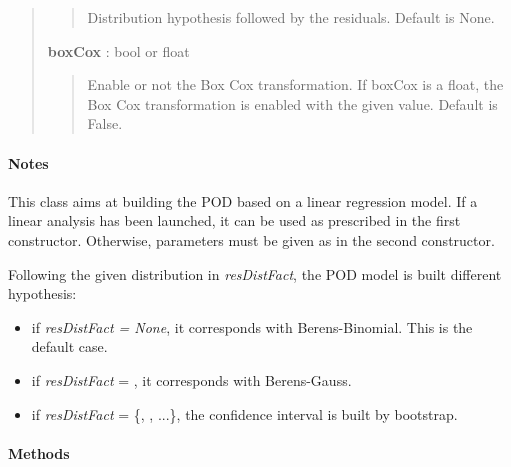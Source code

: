 \documentclass[letterpaper,10pt,english]{sphinxmanual}
\begin{document}
\begin{fulllineitems}
\begin{quote}
\begin{description}
\begin{quote}
Distribution hypothesis followed by the residuals. Default is None.
\end{quote}

\textbf{boxCox} : bool or float
\begin{quote}

Enable or not the Box Cox transformation. If boxCox is a float, the Box
Cox transformation is enabled with the given value. Default is False.
\end{quote}

\end{description}\end{quote}
\paragraph{Notes}

This class aims at building the POD based on a linear regression
model. If a linear analysis has been launched, it can be used as prescribed 
in the first constructor. Otherwise, parameters must be given as in the
second constructor.

Following the given distribution in \emph{resDistFact}, the POD model is built
different hypothesis:
\begin{itemize}
\item {} 
if \emph{resDistFact = None}, it corresponds with Berens-Binomial. This
is the default case.

\item {} 
if \emph{resDistFact} = \href{http://doc.openturns.org/openturns-latest/sphinx/user\_manual/\_generated/openturns.NormalFactory.html\#openturns.NormalFactory}{}, it corresponds with Berens-Gauss.

\item {} 
if \emph{resDistFact} = \{\href{http://doc.openturns.org/openturns-latest/sphinx/user\_manual/\_generated/openturns.KernelSmoothing.html\#openturns.KernelSmoothing}{},
\href{http://doc.openturns.org/openturns-latest/sphinx/user\_manual/\_generated/openturns.WeibullFactory.html\#openturns.WeibullFactory}{}, ...\}, the confidence interval is
built by bootstrap.

\end{itemize}
\paragraph{Methods}

\begin{longtable}{ll}
\hline
\endfirsthead


\end{longtable}
\end{fulllineitems}
\end{document}
